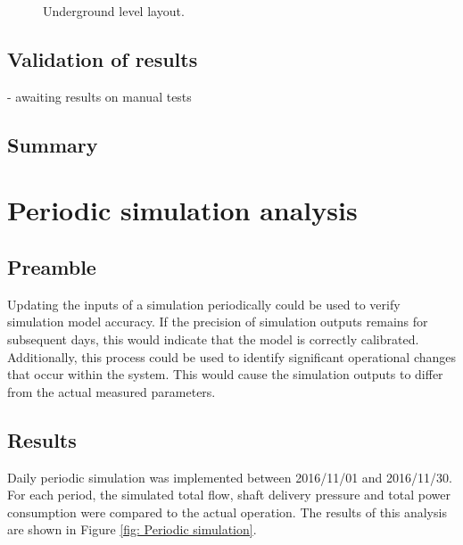 	\begin{figure}[h!]
		\centering
		\caption{Underground level layout.}
		\label{fig: KUS Simulation level layout}
	\end{figure}	
	
	
	\subsection{Validation of results}
	
	- awaiting results on manual tests
	
	\subsection{Summary}
\newpage
\section{Periodic simulation analysis}
	\subsection{Preamble}
	Updating the inputs of a simulation periodically could be used to verify simulation model accuracy. If the precision of simulation outputs remains for subsequent days, this would indicate that the model is correctly calibrated. Additionally, this process could be used to identify significant operational changes that occur within the system. This would cause the simulation outputs to differ from the actual measured parameters. 
	\par 

	     \subsection{Results}
	     Daily periodic simulation was implemented between 2016/11/01 and 2016/11/30. For each period, the simulated total flow, shaft delivery pressure and total power consumption were compared to the actual operation. The results of this analysis are shown in Figure \ref{fig: Periodic simulation}.
	     \par 
	     
